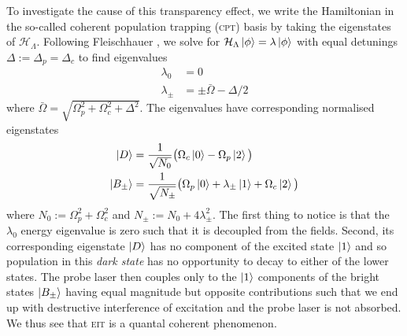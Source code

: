     To investigate the cause of this transparency effect, we write the
    Hamiltonian in the so-called coherent population trapping (\textsc{cpt})
    basis by taking the eigenstates of $\mathcal{H}_\Lambda$. Following
    Fleischhauer \etal\cite{Fleischhauer2005}, we solve for $\mathcal{H}_\Lambda
    \Ket{\phi} = \lambda \Ket{\phi}$ with equal detunings $\Delta := \Delta_p =
    \Delta_c$ to find eigenvalues
    \begin{subequations}
      \begin{align}
      \lambda_0 &= 0 \\
      \lambda_\pm &= \pm \bar{\Omega} -\Delta/2 
      \end{align}
      \label{eqn:lambda_eigvals}
    \end{subequations}
    where $\bar{\Omega}= \sqrt{\Omega_p^2 + \Omega_c^2 + \Delta^2}$. The
    eigenvalues have corresponding normalised eigenstates 
    \begin{subequations}
      \begin{align}
        \Ket{D} &= \frac{1}{\sqrt{N_0}} \big( \Omega_c \Ket{0} - \Omega_p 
        \Ket{2} \big) \\
        \Ket{B_\pm} &= \frac{1}{\sqrt{N_\pm}} \big( \Omega_p \Ket{0} + 
          \lambda_\pm \Ket{1} + \Omega_c \Ket{2} \big)
      \end{align}
      \label{eqn:lambda_eigvects}
    \end{subequations}
    where $N_0 := \Omega_p^2 + \Omega_c^2$ and $N_\pm := N_0 + 4 \lambda_\pm^2$.
    The first thing to notice is that the $\lambda_0$ energy eigenvalue is zero
    such that it is decoupled from the fields. Second, its corresponding
    eigenstate $\Ket{D}$ has no component of the excited state $\Ket{1}$ and so
    population in this \textit{dark state} has no opportunity to decay to either
    of the lower states. The probe laser then couples only to the $\Ket{1}$
    components of the bright states $\Ket{B_\pm}$ having equal magnitude but
    opposite contributions such that we end up with destructive interference of
    excitation and the probe laser is not absorbed. We thus see that
    \textsc{eit} is a quantal coherent phenomenon.

    


